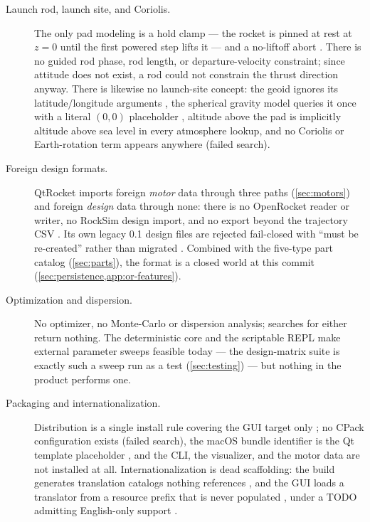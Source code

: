 \begin{description}
\item[Launch rod, launch site, and Coriolis.] The only pad modeling is a hold clamp ---
the rocket is pinned at rest at $z = 0$ until the first powered step lifts it
 --- and a no-liftoff abort .
There is no guided rod phase, rod length, or departure-velocity constraint; since attitude
does not exist, a rod could not constrain the thrust direction anyway. There is likewise no
launch-site concept: the geoid ignores its latitude/longitude arguments
, the spherical gravity model queries it once with a
literal $(0, 0)$ placeholder , altitude above the
pad is implicitly altitude above sea level in every atmosphere lookup, and no Coriolis or
Earth-rotation term appears anywhere (failed search).

\item[Foreign design formats.] QtRocket imports foreign \emph{motor} data through three
paths (\cref{sec:motors}) and foreign \emph{design} data through none: there is no
OpenRocket  reader or writer, no RockSim  design import, and no
export beyond the trajectory CSV . Its own legacy 0.1 design files
are rejected fail-closed with ``must be re-created'' rather than migrated
. Combined with the five-type part catalog
(\cref{sec:parts}), the  format is a closed world at this commit
(\cref{sec:persistence,app:or-features}).

\item[Optimization and dispersion.] No optimizer, no Monte-Carlo or dispersion analysis;
searches for either return nothing. The deterministic core and the scriptable REPL make
external parameter sweeps feasible today --- the design-matrix suite is exactly such a
sweep run as a test (\cref{sec:testing}) --- but nothing in the product performs one.

\item[Packaging and internationalization.] Distribution is a single install rule covering
the GUI target only ; no CPack configuration exists (failed
search), the macOS bundle identifier is the Qt template placeholder
, and the CLI, the visualizer, and the motor data are not
installed at all. Internationalization is dead scaffolding: the build generates translation
catalogs nothing references , and the GUI loads a translator from
a resource prefix that is never populated , under a TODO
admitting English-only support .

\end{description}

